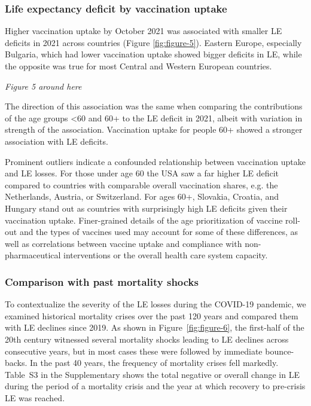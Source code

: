 \documentclass[12pt]{article}
\begin{document}
\subsubsection*{Life expectancy deficit by vaccination uptake}

Higher vaccination uptake by October 2021 was associated with smaller LE deficits in 2021 across countries (Figure \ref{fig:figure-5}). Eastern Europe, especially Bulgaria, which had lower vaccination uptake showed bigger deficits in LE, while the opposite was true for most Central and Western European countries.

\par\medskip
\emph{Figure 5 around here}
\par\medskip

The direction of this association was the same when comparing the contributions of the age groups <60 and 60+ to the LE deficit in 2021, albeit with variation in strength of the association. Vaccination uptake for people 60+ showed a stronger association with LE deficits.

Prominent outliers indicate a confounded relationship between vaccination uptake and LE losses. For those under age 60 the USA saw a far higher LE deficit compared to countries with comparable overall vaccination shares, e.g. the Netherlands, Austria, or Switzerland. For ages 60+, Slovakia, Croatia, and Hungary stand out as countries with surprisingly high LE deficits given their vaccination uptake. Finer-grained details of the age prioritization of vaccine roll-out and the types of vaccines used may account for some of these differences, as well as correlations between vaccine uptake and compliance with non-pharmaceutical interventions or the overall health care system capacity.

\subsubsection*{Comparison with past mortality shocks}

To contextualize the severity of the LE losses during the COVID-19 pandemic, we examined historical mortality crises over the past 120 years and compared them with LE declines since 2019. As shown in Figure~\ref{fig:figure-6}, the first-half of the 20th century witnessed several mortality shocks leading to LE declines across consecutive years, but in most cases these were followed by immediate bounce-backs. In the past 40 years, the frequency of mortality crises fell markedly. Table~S3 in the Supplementary shows the total negative or overall change in LE during the period of a mortality crisis and the year at which recovery to pre-crisis LE was reached.
\end{document}
